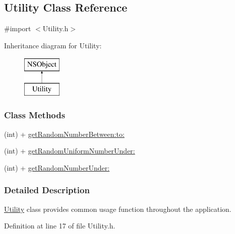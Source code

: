 \hypertarget{interface_utility}{\subsection{Utility Class Reference}
\label{d3/dc7/interface_utility}
}


{\ttfamily \#import $<$Utility.\-h$>$}

Inheritance diagram for Utility\-:\begin{figure}[H]
\begin{center}
\leavevmode
\includegraphics[height=2.000000cm]{d3/dc7/interface_utility}
\end{center}
\end{figure}
\subsubsection*{Class Methods}
\begin{DoxyCompactItemize}
\item 
(int) + \hyperlink{interface_utility_a1fadf871f2de27c45caf4497a769f3d8}{get\-Random\-Number\-Between\-:to\-:}
\item 
(int) + \hyperlink{interface_utility_a18dd8a4d335aacab117cfefa4fffb06c}{get\-Random\-Uniform\-Number\-Under\-:}
\item 
(int) + \hyperlink{interface_utility_a7af585df1742d836af6bc5b0eaf09cd3}{get\-Random\-Number\-Under\-:}
\end{DoxyCompactItemize}


\subsubsection{Detailed Description}
\hyperlink{interface_utility}{Utility} class provides common usage function throughout the application. 

Definition at line 17 of file Utility.\-h.



